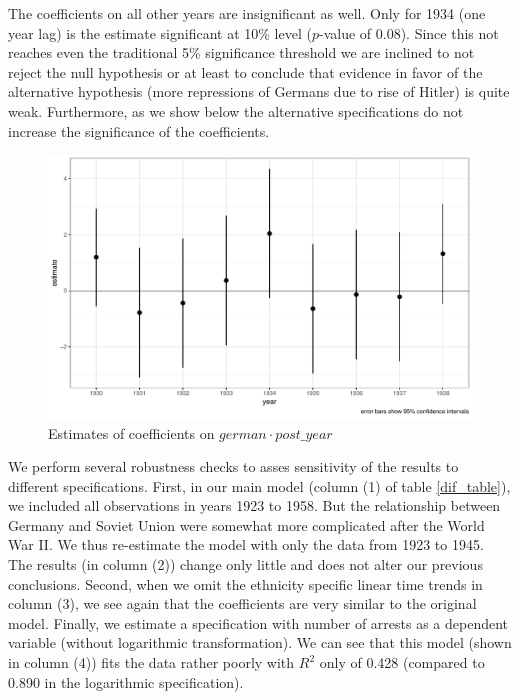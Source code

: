 \documentclass[11pt]{article}
\begin{document}
The coefficients on all other years are insignificant as well. Only for 1934 (one year lag) is the estimate  significant at 10\% level ($p$-value of 0.08). Since this not reaches even the traditional 5\% significance threshold we are inclined to not reject the null hypothesis or at least to conclude that evidence in favor of the alternative hypothesis (more repressions of Germans due to rise of Hitler) is quite weak.  Furthermore, as we show below the alternative specifications do not increase the significance of the coefficients.
\begin{figure}[h]
\centering
\includegraphics[width=\textwidth]{plots/did_effects.pdf}
\caption{Estimates of coefficients on $german \cdot post\_year$}
\label{fig_did_effets}
\end{figure}

We perform several robustness checks to asses sensitivity of the results to different specifications. First, in our main model (column (1) of table \ref{dif_table}), we included all observations in years 1923 to 1958. But the relationship between Germany and Soviet Union were somewhat more complicated after the World War II. We thus re-estimate the model with only the data from 1923 to 1945. The results (in column (2)) change only little and does not alter our previous conclusions. Second, when we omit the ethnicity specific linear time trends in column (3), we see again that the coefficients are very similar to the original model. 
Finally, we estimate a specification with number of arrests as a dependent variable (without logarithmic transformation). We can see that this model (shown in column (4)) fits the data rather poorly with  $R^2$ only of 0.428 (compared to 0.890 in the logarithmic specification). 
\end{document}

